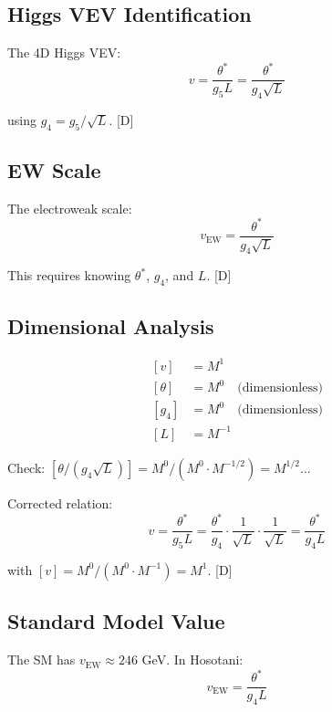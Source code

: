 \documentclass[11pt,a4paper]{article}
\newcommand{\tagD}{\textcolor{blue!70!black}{[D]}}
\begin{document}
\subsection{Higgs VEV Identification}

The 4D Higgs VEV:
\begin{equation}
\label{eq:higgs-vev}
v = \frac{\theta^*}{g_5 L} = \frac{\theta^*}{g_4 \sqrt{L}}
\end{equation}

using $g_4 = g_5/\sqrt{L}$. \tagD

\subsection{EW Scale}

The electroweak scale:
\begin{equation}
\label{eq:ew-scale}
v_{\text{EW}} = \frac{\theta^*}{g_4 \sqrt{L}}
\end{equation}

This requires knowing $\theta^*$, $g_4$, and $L$. \tagD

\subsection{Dimensional Analysis}

\begin{align}
\label{eq:dim-v}
[v] &= M^1 \\
\label{eq:dim-theta}
[\theta] &= M^0 \quad \text{(dimensionless)} \\
\label{eq:dim-g4}
[g_4] &= M^0 \quad \text{(dimensionless)} \\
\label{eq:dim-L}
[L] &= M^{-1}
\end{align}

Check: $[\theta/(g_4 \sqrt{L})] = M^0 / (M^0 \cdot M^{-1/2}) = M^{1/2}$...

Corrected relation:
\begin{equation}
\label{eq:v-correct}
v = \frac{\theta^*}{g_5 L} = \frac{\theta^*}{g_4} \cdot \frac{1}{\sqrt{L}} \cdot \frac{1}{\sqrt{L}} = \frac{\theta^*}{g_4 L}
\end{equation}

with $[v] = M^0/(M^0 \cdot M^{-1}) = M^1$. \checkmark \tagD

\subsection{Standard Model Value}

The SM has $v_{\text{EW}} \approx 246$ GeV. In Hosotani:
\begin{equation}
\label{eq:v-hosotani}
v_{\text{EW}} = \frac{\theta^*}{g_4 L}
\end{equation}
\end{document}
